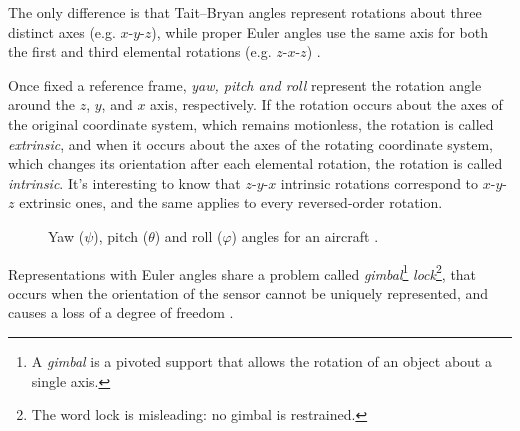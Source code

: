 The only difference is that Tait–Bryan angles represent rotations about three distinct axes (e.g. $x$-$y$-$z$), while proper Euler angles use the same axis for both the first and third elemental rotations (e.g. $z$-$x$-$z$) \cite{Sta18}.

Once fixed a reference frame, \textit{yaw, pitch and roll} represent the rotation angle around the $z$, $y$, and $x$ axis, respectively.
If the rotation occurs about the axes of the original coordinate system, which remains motionless, the rotation is called \textit{extrinsic}, and when it occurs about the axes of the rotating coordinate system, which changes its orientation after each elemental rotation, the rotation is called \textit{intrinsic}. It's interesting to know that $z$-$y$-$x$ intrinsic rotations correspond to $x$-$y$-$z$ extrinsic ones, and the same applies to every reversed-order rotation.

\begin{center}
	\begin{figure}[ht!]
		\caption{Yaw ($\psi$), pitch ($\theta$) and roll ($\varphi$) angles for an aircraft \cite{WikimediaPlane}.}
	\end{figure}
\end{center}
Representations with Euler angles share a problem called \textit{gimbal}\footnote{A \textit{gimbal} is a pivoted support that allows the rotation of an object about a single axis.} \textit{lock}\footnote{The word lock is misleading: no gimbal is restrained.}, that occurs when the orientation of the sensor cannot be uniquely represented, and causes a loss of a degree of freedom \cite{Dil18}.

